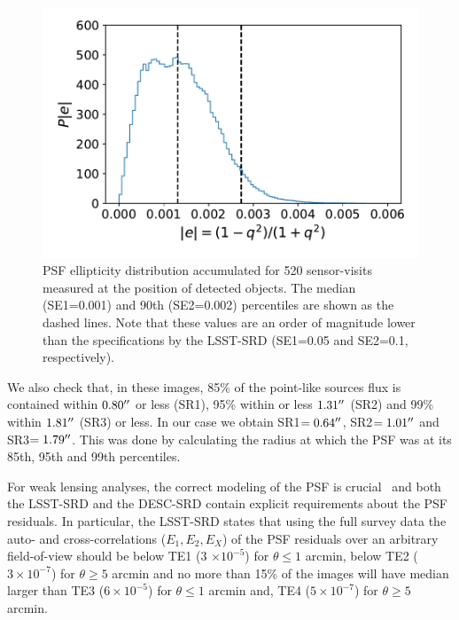 \documentclass[twocolumn]{aastex62}
\begin{document}
\begin{figure}
\centering
\includegraphics[width=0.9\columnwidth]{PSF_ellipticity_DC1}
\caption{PSF ellipticity distribution accumulated for 520 sensor-visits measured at the position of detected objects. The median (SE1=0.001) and 90th (SE2=0.002) percentiles are shown as the dashed lines. Note that these values are an order of magnitude lower than the specifications by the LSST-SRD (SE1=0.05 and SE2=0.1, respectively).}
\label{fig:SE1_DC1}
\end{figure}

We also check that, in these images, 85\% of the point-like sources flux is contained within $0.80\mbox{$^{\prime\prime}$}$ or less (SR1), 95\% within or less $1.31\mbox{$^{\prime\prime}$}$ (SR2) and 99\% within $1.81\mbox{$^{\prime\prime}$}$ (SR3) or less. In our case we obtain SR1$=0.64\mbox{$^{\prime\prime}$}$, SR2$=1.01\mbox{$^{\prime\prime}$}$ and SR3$=1.79\mbox{$^{\prime\prime}$}$. This was done by calculating the radius at which the PSF was at its 85th, 95th and 99th percentiles.

For weak lensing analyses, the correct modeling of the PSF is crucial~\citep{2004MNRAS.353..529H} and both the LSST-SRD and the DESC-SRD contain explicit requirements about the PSF residuals. In particular, the LSST-SRD states that using the full survey data the auto- and cross-correlations ($E_{1}, E_{2}, E_{X}$) of the PSF residuals over an arbitrary field-of-view should be below TE1 (3 $\times 10^{-5}$) for $\theta \leq 1$ arcmin, below TE2 ($3 \times 10^{-7}$) for $\theta \geq 5$ arcmin and no more than 15\% of the images will have median larger than TE3 ($6 \times 10^{-5}$) for $\theta \leq 1$ arcmin and, TE4 ($5 \times 10^{-7}$) for $\theta \geq 5$ arcmin. 
\end{document}
